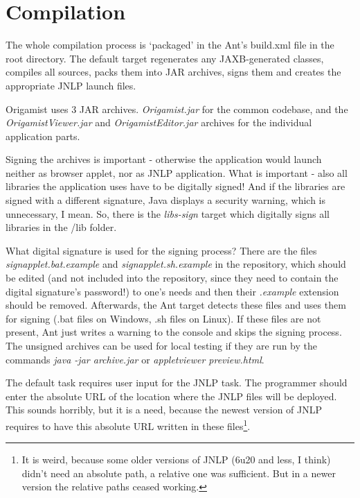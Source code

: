 \section{Compilation}
The whole compilation process is `packaged' in the Ant's build.xml file in the root directory. The default target regenerates any JAXB-generated classes, compiles all sources, packs them into JAR archives, signs them and creates the appropriate JNLP launch files. 

Origamist uses 3 JAR archives. \emph{Origamist.jar} for the common codebase, and the \emph{OrigamistViewer.jar} and \emph{OrigamistEditor.jar} archives for the individual application parts.

Signing the archives is important - otherwise the application would launch neither as browser applet, nor as JNLP application. What is important - also all libraries the application uses have to be digitally signed! And if the libraries are signed with a different signature, Java displays a security warning, which is unnecessary, I mean. So, there is the \emph{libs-sign} target which digitally signs all libraries in the /lib folder.

What digital signature is used for the signing process? There are the files \emph{signapplet.bat.example} and \emph{signapplet.sh.example} in the repository, which should be edited (and not included into the repository, since they need to contain the digital signature's password!) to one's needs and then their \emph{.example} extension should be removed. Afterwards, the Ant target detects these files and uses them for signing (.bat files on Windows, .sh files on Linux). If these files are not present, Ant just writes a warning to the console and skips the signing process. The unsigned archives can be used for local testing if they are run by the commands \emph{java -jar archive.jar} or \emph{appletviewer preview.html}.

The default task requires user input for the JNLP task. The programmer should enter the absolute URL of the location where the JNLP files will be deployed. This sounds horribly, but it is a need, because the newest version of JNLP requires to have this absolute URL written in these files\footnote{It is weird, because some older versions of JNLP (6u20 and less, I think) didn't need an absolute path, a relative one was sufficient. But in a newer version the relative paths ceased working.}.

